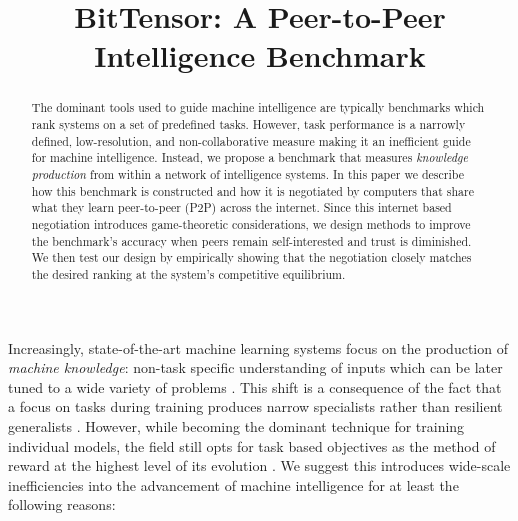 \documentclass{article}
\title{BitTensor: A Peer-to-Peer Intelligence Benchmark}
\begin{document}
\maketitle

\begin{abstract}
The dominant tools used to guide machine intelligence are typically benchmarks which rank systems on a set of predefined tasks. However, task performance is a narrowly defined, low-resolution, and non-collaborative measure making it an inefficient guide for machine intelligence. Instead, we propose a benchmark that measures \textit{knowledge production} from within a network of intelligence systems. In this paper we describe how this benchmark is constructed and how it is negotiated by computers that share what they learn peer-to-peer (P2P) across the internet. Since this internet based negotiation introduces game-theoretic considerations, we design methods to improve the benchmark's accuracy when peers remain self-interested and trust is diminished. We then test our design by empirically showing that the negotiation closely matches the desired ranking at the system's competitive equilibrium. 

\end{abstract}

Increasingly, state-of-the-art machine learning systems focus on the production of \textit{machine knowledge}: non-task specific understanding of inputs which can be later tuned to a wide variety of problems \cite{devlin2018bert}. This shift is a consequence of the fact that a focus on tasks during training produces narrow specialists rather than resilient generalists \cite{radford2019language}. However, while becoming the dominant technique for training individual models, the field still opts for task based objectives as the method of reward at the highest level of its evolution \cite{wang2018glue}. We suggest this introduces wide-scale inefficiencies into the advancement of machine intelligence for at least the following reasons:
\end{document}
